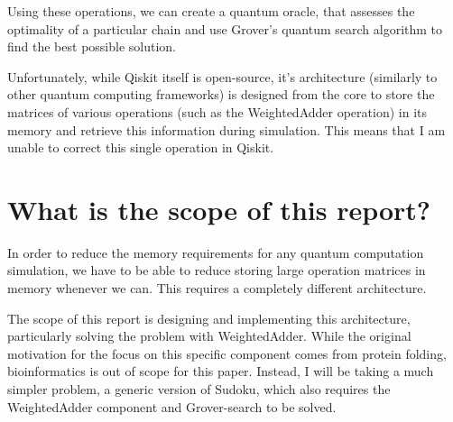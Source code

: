 Using these operations, we can create a quantum oracle, that assesses the optimality of a particular chain and use Grover's quantum search algorithm to find the best possible solution.

Unfortunately, while Qiskit itself is open-source, it's architecture (similarly to other quantum computing frameworks) is designed from the core to store the matrices of various operations (such as the WeightedAdder operation) in its memory and retrieve this information during simulation. This means that I am unable to correct this single operation in Qiskit.

\section{What is the scope of this report?}

In order to reduce the memory requirements for any quantum computation simulation, we have to be able to reduce storing large operation matrices in memory whenever we can. This requires a completely different architecture.

The scope of this report is designing and implementing this architecture, particularly solving the problem with WeightedAdder. While the original motivation for the focus on this specific component comes from protein folding, bioinformatics is out of scope for this paper. Instead, I will be taking a much simpler problem, a generic version of Sudoku, which also requires the WeightedAdder component and Grover-search to be solved.
